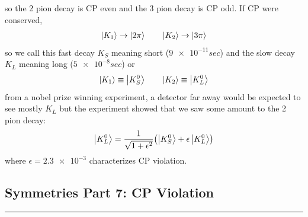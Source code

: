 \documentclass[../main.tex]{subfiles}
\begin{document}
so the 2 pion decay is CP even and the 3 pion decay is CP odd. If CP were conserved,
\begin{align*}
    \ket{K_1} \to \ket{2\pi} \qquad \ket{K_2} \to \ket{3\pi}
\end{align*}
so we call this fast decay $K_S$ meaning short ($\num{9e-11}{sec}$) and the slow decay $K_L$ meaning
long ($\num{5e-8}{sec}$) or
\begin{align*}
    \ket{K_1} \equiv \ket{K_S^0} \qquad \ket{K_2} \equiv \ket{K_L^0}
\end{align*}
from a nobel prize winning experiment, a detector far away would be expected to see mostly $K_L$ but
the experiment showed that we saw some amount to the 2 pion decay:
\begin{align*}
    \ket{K_L^0} = \frac{1}{\sqrt{1 + \epsilon^2}} \qt(\ket{K_S^0} + \epsilon \ket{K_L^0})
\end{align*}
where $\epsilon = \num{2.3e-3}$ characterizes CP violation.

\newpage
{}
\subsection*{Symmetries Part 7: CP Violation}
\hrule \vspace{10px}
\end{document}
